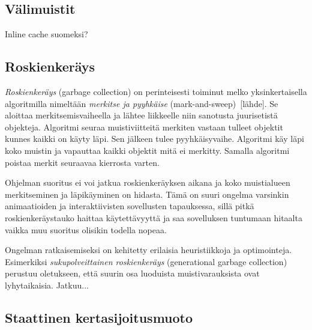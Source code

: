 \subsection{Välimuistit}

Inline cache suomeksi?

\subsection{Roskienkeräys}

\textit{Roskienkeräys} (garbage collection) on perinteisesti toiminut melko yksinkertaisella algoritmilla nimeltään \textit{merkitse ja pyyhkäise} (mark-and-sweep)~[lähde]. Se aloittaa merkitsemisvaiheella ja lähtee liikkeelle niin sanotusta juurisetistä objekteja. Algoritmi seuraa muistiviitteitä merkiten vastaan tulleet objektit kunnes kaikki on käyty läpi. Sen jälkeen tulee pyyhkäisyvaihe. Algoritmi käy läpi koko muistin ja vapauttaa kaikki objektit mitä ei merkitty. Samalla  algoritmi poistaa merkit seuraavaa kierrosta varten.

Ohjelman suoritus ei voi jatkua roskienkeräyksen aikana ja koko muistialueen merkitseminen ja läpikäyminen on hidasta. Tämä on suuri ongelma varsinkin animaatioiden ja interaktiivisten sovellusten tapauksessa, sillä pitkä roskienkeräystauko haittaa käytettävyyttä ja saa sovelluksen tuntumaan hitaalta vaikka muu suoritus olisikin todella nopeaa.

Ongelman ratkaisemiseksi on kehitetty erilaisia heuristiikkoja ja optimointeja. Esimerkiksi \textit{sukupolveittainen roskienkeräys} (generational garbage collection) perustuu oletukseen, että suurin osa luoduista muistivarauksista ovat lyhytaikaisia. Jatkuu...

\subsection{Staattinen kertasijoitusmuoto}

